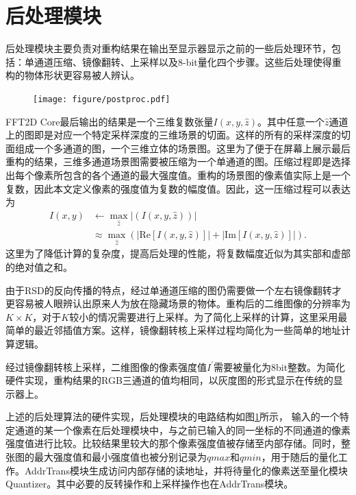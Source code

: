 \documentclass[master]{shtthesis}             %
\begin{document}
\section{后处理模块}\label{sec:postproc}

后处理模块主要负责对重构结果在输出至显示器显示之前的一些后处理环节，包括：单通道压缩、镜像翻转、上采样以及8-bit量化四个步骤。这些后处理使得重构的物体形状更容易被人辨认。

\begin{figure}[!tb]
    \centering
    \texttt{[image: figure/postproc.pdf]}
    \label{fig:pp}
\end{figure}

FFT2D Core最后输出的结果是一个三维复数张量$I(x,y,\hat{z})$。其中任意一个$\hat{z}$通道上的图即是对应一个特定采样深度的三维场景的切面。这样的所有的采样深度的切面组成一个多通道的图，一个三维立体的场景图。这里为了便于在屏幕上展示最后重构的结果，三维多通道场景图需要被压缩为一个单通道的图。压缩过程即是选择出每个像素所包含的各个通道的最大强度值。重构的场景图的像素值实际上是一个复数，因此本文定义像素的强度值为复数的幅度值。因此，这一压缩过程可以表达为
\begin{equation}
  \begin{split}
    I(x, y) &\leftarrow \max_{\hat{z}} |(I(x, y, \hat{z}))| \\
    &\approx \max_{\hat{z}} \left(|\text{Re}[I(x,y,\hat{z})]| + |\text{Im}[I(x,y,\hat{z})]| \right).
  \end{split}
\end{equation}
这里为了降低计算的复杂度，提高后处理的性能，将复数幅度近似为其实部和虚部的绝对值之和。

由于RSD的反向传播的特点，经过单通道压缩的图仍需要做一个左右镜像翻转才更容易被人眼辨认出原来人为放在隐藏场景的物体。重构后的二维图像的分辨率为$K\times K$，对于$K$较小的情况需要进行上采样。为了简化上采样的计算，这里采用最简单的最近邻插值方案。这样，镜像翻转核上采样过程均简化为一些简单的地址计算逻辑。

经过镜像翻转核上采样，二维图像的像素强度值$I^\prime$需要被量化为8bit整数。为简化硬件实现，重构结果的RGB三通道的值均相同，以灰度图的形式显示在传统的显示器上。

上述的后处理算法的硬件实现，后处理模块的电路结构如图\ref{fig:pp}所示，
输入的一个特定通道的某一个像素在后处理模块中，与之前已输入的同一坐标的不同通道的像素强度值进行比较。比较结果里较大的那个像素强度值被存储至内部存储。同时，整张图的最大强度值和最小强度值也被分别记录为$qmax$和$qmin$，用于随后的量化工作。{AddrTrans}模块生成访问内部存储的读地址，并将待量化的像素送至量化模块{Quantizer}。其中必要的反转操作和上采样操作也在{AddrTrans}模块。
\end{document}
